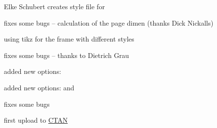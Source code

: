 \documentclass[parskip=false,english,11pt]{ltxmdf}
\begin{document}
\begin{itemize*}
\item Elke Schubert creates style file for 
\item fixes some bugs -- calculation of the page dimen (thanks  Dick Nickalls)
\item using tikz for the frame with different styles
\end{itemize*}

\begin{itemize*}
\item fixes some bugs -- thanks to Dietrich Grau
\item added new options: 
\end{itemize*}

\begin{itemize*}
\item added new options:  and 
\item fixes some bugs
\end{itemize*}

\begin{itemize*}
\item first upload to \href{http://dante.ctan.org/upload}{CTAN}
\end{itemize*}
\end{document}
